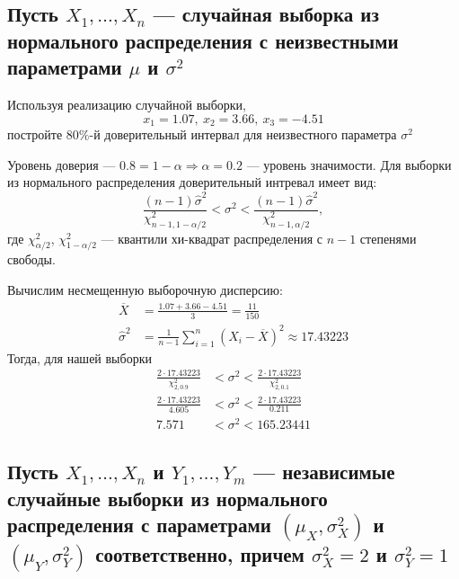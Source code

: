 \documentclass{article}
\begin{document}
\subsection{Пусть $X_{1}, \ldots, X_{n}$ — случайная выборка из нормального распределения с неизвестными параметрами $\mu$ и $\sigma^{2}$}
Используя реализацию случайной выборки,
\begin{equation*}
    x_{1}=1.07,\ x_{2}=3.66,\ x_{3}=-4.51
\end{equation*}
постройте $80 \%$-й доверительный интервал для неизвестного параметра $\sigma^{2}$

Уровень доверия — $0.8=1-\alpha\Longrightarrow\alpha=0.2$ — уровень значимости. Для выборки из нормального распределения доверительный интревал имеет вид:
\begin{equation*}
    \frac{(n - 1)\hat{\sigma}^2}{\chi^2_{n-1,1 - \alpha/2}}<\sigma^2< \frac{(n - 1)\hat{\sigma}^2}{\chi^2_{n-1,\alpha/2}},
\end{equation*}
где $\chi^2_{\alpha/2}$, $\chi^2_{1 - \alpha/2}$ — квантили хи-квадрат распределения с $n - 1$ степенями свободы.

Вычислим несмещенную выборочную дисперсию:
\begin{equation*}
    \begin{aligned}
        \overline{X}&=\frac{1.07+3.66-4.51}{3}=\frac{11}{150}\\
        \widehat{\sigma}^2&=\frac{1}{n-1}\sum_{i=1}^n\left(X_i-\overline{X}\right)^2\approx17.43223
    \end{aligned}
\end{equation*}
Тогда, для нашей выборки
\begin{equation*}
    \begin{aligned}
        \frac{2\cdot17.43223}{\chi^2_{2,0.9}}&<\sigma^2<\frac{2\cdot17.43223}{\chi^2_{2,0.1}}\\
        \frac{2\cdot17.43223}{4.605}&<\sigma^2<\frac{2\cdot17.43223}{0.211}\\
        7.571&<\sigma^2<165.23441
    \end{aligned}
\end{equation*}

\subsection{Пусть $X_{1}, \ldots, X_{n}$ и $Y_{1}, \ldots, Y_{m}$ — независимые случайные выборки из нормального распределения с параметрами $(\mu_{X}, \sigma_{X}^{2})$ и $(\mu_{Y}, \sigma_{Y}^{2})$ соответственно, причем $\sigma_{X}^{2}=2$ и $\sigma_{Y}^{2}=1$}
\end{document}
